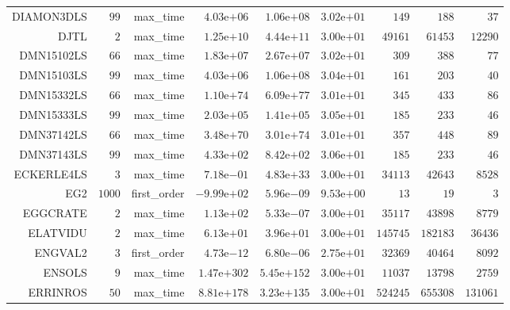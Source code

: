 \begin{longtable}{rrrrrrrrr}
DIAMON3DLS & \(    99\) & max\_time & \( 4.03\)e\(+06\) & \( 1.06\)e\(+08\) & \( 3.02\)e\(+01\) & \(   149\) & \(   188\) & \(    37\) \\
DJTL & \(     2\) & max\_time & \( 1.25\)e\(+10\) & \( 4.44\)e\(+11\) & \( 3.00\)e\(+01\) & \( 49161\) & \( 61453\) & \( 12290\) \\
DMN15102LS & \(    66\) & max\_time & \( 1.83\)e\(+07\) & \( 2.67\)e\(+07\) & \( 3.02\)e\(+01\) & \(   309\) & \(   388\) & \(    77\) \\
DMN15103LS & \(    99\) & max\_time & \( 4.03\)e\(+06\) & \( 1.06\)e\(+08\) & \( 3.04\)e\(+01\) & \(   161\) & \(   203\) & \(    40\) \\
DMN15332LS & \(    66\) & max\_time & \( 1.10\)e\(+74\) & \( 6.09\)e\(+77\) & \( 3.01\)e\(+01\) & \(   345\) & \(   433\) & \(    86\) \\
DMN15333LS & \(    99\) & max\_time & \( 2.03\)e\(+05\) & \( 1.41\)e\(+05\) & \( 3.05\)e\(+01\) & \(   185\) & \(   233\) & \(    46\) \\
DMN37142LS & \(    66\) & max\_time & \( 3.48\)e\(+70\) & \( 3.01\)e\(+74\) & \( 3.01\)e\(+01\) & \(   357\) & \(   448\) & \(    89\) \\
DMN37143LS & \(    99\) & max\_time & \( 4.33\)e\(+02\) & \( 8.42\)e\(+02\) & \( 3.06\)e\(+01\) & \(   185\) & \(   233\) & \(    46\) \\
ECKERLE4LS & \(     3\) & max\_time & \( 7.18\)e\(-01\) & \( 4.83\)e\(+33\) & \( 3.00\)e\(+01\) & \( 34113\) & \( 42643\) & \(  8528\) \\
EG2 & \(  1000\) & first\_order & \(-9.99\)e\(+02\) & \( 5.96\)e\(-09\) & \( 9.53\)e\(+00\) & \(    13\) & \(    19\) & \(     3\) \\
EGGCRATE & \(     2\) & max\_time & \( 1.13\)e\(+02\) & \( 5.33\)e\(-07\) & \( 3.00\)e\(+01\) & \( 35117\) & \( 43898\) & \(  8779\) \\
ELATVIDU & \(     2\) & max\_time & \( 6.13\)e\(+01\) & \( 3.96\)e\(+01\) & \( 3.00\)e\(+01\) & \(145745\) & \(182183\) & \( 36436\) \\
ENGVAL2 & \(     3\) & first\_order & \( 4.73\)e\(-12\) & \( 6.80\)e\(-06\) & \( 2.75\)e\(+01\) & \( 32369\) & \( 40464\) & \(  8092\) \\
ENSOLS & \(     9\) & max\_time & \(1.47\)e\(+302\) & \(5.45\)e\(+152\) & \( 3.00\)e\(+01\) & \( 11037\) & \( 13798\) & \(  2759\) \\
ERRINROS & \(    50\) & max\_time & \(8.81\)e\(+178\) & \(3.23\)e\(+135\) & \( 3.00\)e\(+01\) & \(524245\) & \(655308\) & \(131061\) \\

\end{longtable}
